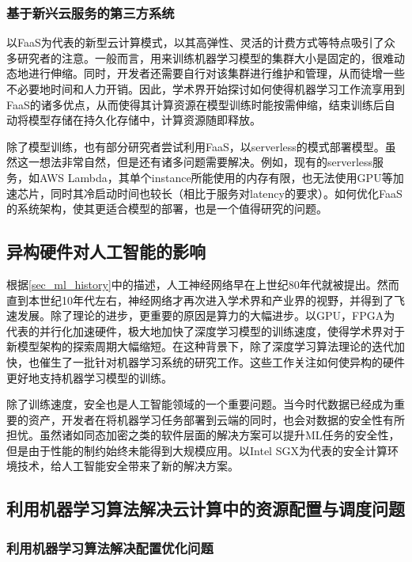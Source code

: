 \subsubsection{基于新兴云服务的第三方系统}

以FaaS为代表的新型云计算模式，以其高弹性、灵活的计费方式等特点吸引了众多研究者的注意。一般而言，用来训练机器学习模型的集群大小是固定的，很难动态地进行伸缩。同时，开发者还需要自行对该集群进行维护和管理，从而徒增一些不必要地时间和人力开销。因此，学术界开始探讨如何使得机器学习工作流享用到FaaS的诸多优点\parencite{wang2019distributed}，从而使得其计算资源在模型训练时能按需伸缩，结束训练后自动将模型存储在持久化存储中，计算资源随即释放。

除了模型训练，也有部分研究者尝试利用FaaS，以serverless的模式部署模型。虽然这一想法非常自然，但是还有诸多问题需要解决。例如，现有的serverless服务，如AWS Lambda，其单个instance所能使用的内存有限，也无法使用GPU等加速芯片，同时其冷启动时间也较长（相比于服务对latency的要求）。如何优化FaaS的系统架构，使其更适合模型的部署，也是一个值得研究的问题。

\subsection{异构硬件对人工智能的影响}
根据\ref{sec_ml_history}中的描述，人工神经网络早在上世纪80年代就被提出。然而直到本世纪10年代左右，神经网络才再次进入学术界和产业界的视野，并得到了飞速发展。除了理论的进步，更重要的原因是算力的大幅进步。以GPU，FPGA为代表的并行化加速硬件，极大地加快了深度学习模型的训练速度，使得学术界对于新模型架构的探索周期大幅缩短。在这种背景下，除了深度学习算法理论的迭代加快，也催生了一批针对机器学习系统的研究工作。这些工作关注如何使异构的硬件更好地支持机器学习模型的训练。

除了训练速度，安全也是人工智能领域的一个重要问题。当今时代数据已经成为重要的资产，开发者在将机器学习任务部署到云端的同时，也会对数据的安全性有所担忧。虽然诸如同态加密之类的软件层面的解决方案可以提升ML任务的安全性，但是由于性能的制约始终未能得到大规模应用。以Intel SGX\parencite{costan2016intel}为代表的安全计算环境技术，给人工智能安全带来了新的解决方案。


\subsection{利用机器学习算法解决云计算中的资源配置与调度问题}
\subsubsection{利用机器学习算法解决配置优化问题}

